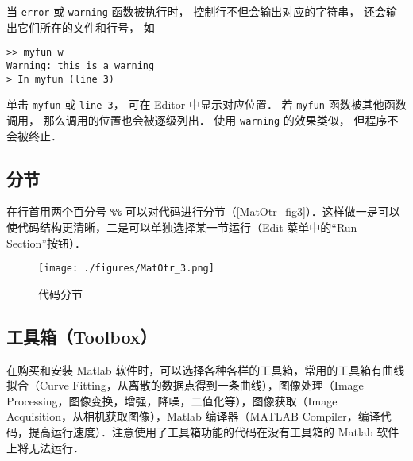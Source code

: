 当 \verb|error| 或 \verb|warning| 函数被执行时， 控制行不但会输出对应的字符串， 还会输出它们所在的文件和行号， 如
\begin{lstlisting}[language=matlabC]
>> myfun w
Warning: this is a warning
> In myfun (line 3)
\end{lstlisting}
单击 \verb|myfun| 或 \verb|line 3|， 可在 Editor 中显示对应位置． 若 \verb|myfun| 函数被其他函数调用， 那么调用的位置也会被逐级列出． 使用 \verb|warning| 的效果类似， 但程序不会被终止．

\subsection{分节}
在行首用两个百分号 \verb|%%| 可以对代码进行分节（\autoref{MatOtr_fig3}）．这样做一是可以使代码结构更清晰，二是可以单独选择某一节运行（Edit 菜单中的“Run Section”按钮）．
\begin{figure}[ht]
\centering
\texttt{[image: ./figures/MatOtr\_3.png]}
\caption{代码分节}\label{MatOtr_fig3}
\end{figure}

\subsection{工具箱（Toolbox）}
在购买和安装 Matlab 软件时，可以选择各种各样的工具箱，常用的工具箱有曲线拟合（Curve Fitting，从离散的数据点得到一条曲线），图像处理（Image Processing，图像变换，增强，降噪，二值化等），图像获取（Image Acquisition，从相机获取图像），Matlab 编译器（MATLAB Compiler，编译代码，提高运行速度）．注意使用了工具箱功能的代码在没有工具箱的 Matlab 软件上将无法运行．




